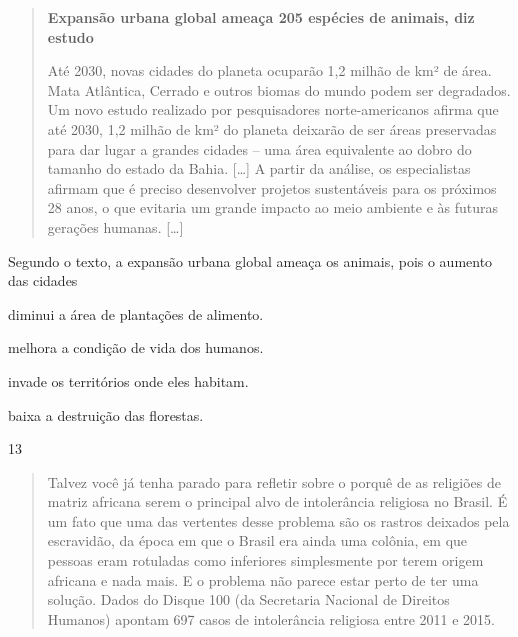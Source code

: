 \begin{quote}
\textbf{Expansão urbana global ameaça 205 espécies de animais, diz estudo}

Até 2030, novas cidades do planeta ocuparão 1,2 milhão de km² de área.
Mata Atlântica, Cerrado e outros biomas do mundo podem ser degradados.
Um novo estudo realizado por pesquisadores norte-americanos afirma que
até 2030, 1,2 milhão de km² do planeta deixarão de ser áreas preservadas
para dar lugar a grandes cidades -- uma área equivalente ao dobro do
tamanho do estado da Bahia. {[}\ldots{}{]}
A partir da análise, os especialistas
afirmam que é preciso desenvolver projetos sustentáveis para os próximos
28 anos, o que evitaria um grande impacto ao meio ambiente e às futuras
gerações humanas. {[}\ldots{}{]}

\end{quote}

\pagebreak
\noindent{}Segundo o texto, a expansão urbana global ameaça os animais, pois o
aumento das cidades

\begin{escolha}
\item diminui a área de plantações de alimento.

\item melhora a condição de vida dos humanos.

\item invade os territórios onde eles habitam.

\item baixa a destruição das florestas.
\end{escolha}


\num{13}

\begin{quote}
Talvez você já tenha parado para refletir sobre o porquê de as religiões de matriz africana serem o principal alvo de intolerância religiosa no Brasil.
É um fato que uma das vertentes desse problema são os rastros deixados pela escravidão, da época em que o Brasil era ainda uma colônia, em que pessoas eram rotuladas como inferiores simplesmente por terem origem africana e nada mais.
E o problema não parece estar perto de ter uma solução. Dados do Disque 100 (da Secretaria Nacional de Direitos Humanos) apontam 697 casos de intolerância religiosa entre 2011 e 2015.

\end{quote}

